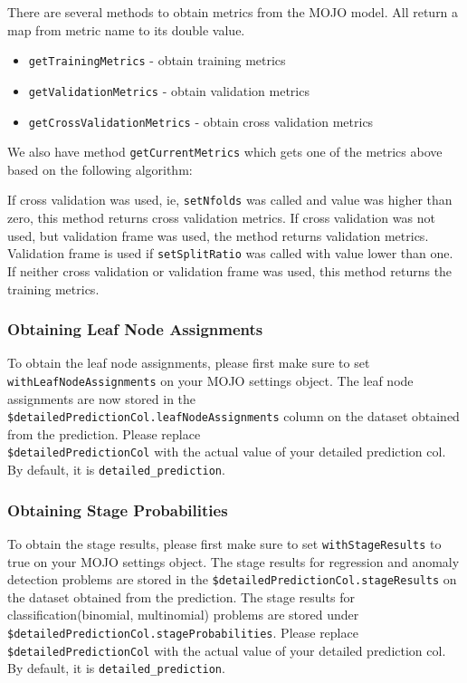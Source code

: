 There are several methods to obtain metrics from the MOJO model. All return a map from metric name to its double value.

\begin{itemize}
    \item \texttt{getTrainingMetrics} - obtain training metrics
    \item \texttt{getValidationMetrics} - obtain validation metrics
    \item \texttt{getCrossValidationMetrics} - obtain cross validation metrics
\end{itemize}


We also have method \texttt{getCurrentMetrics} which gets one of the metrics above based on the following algorithm:

If cross validation was used, ie, \texttt{setNfolds} was called and value was higher than zero, this method returns cross validation
metrics. If cross validation was not used, but validation frame was used, the method returns validation metrics. Validation
frame is used if \texttt{setSplitRatio} was called with value lower than one. If neither cross validation or validation frame
was used, this method returns the training metrics.

\subsubsection{Obtaining Leaf Node Assignments}

To obtain the leaf node assignments, please first make sure to set\\ \texttt{withLeafNodeAssignments}
on your MOJO settings object. The leaf node assignments are now stored
in the \texttt{\${detailedPredictionCol}.leafNodeAssignments} column on the dataset obtained from the prediction.
Please replace\\ \texttt{\${detailedPredictionCol}} with the actual value of your detailed prediction col. By default,
it is \texttt{detailed\_prediction}.

\subsubsection{Obtaining Stage Probabilities}

To obtain the stage results, please first make sure to set \texttt{withStageResults} to true on your MOJO
settings object. The stage results for regression and anomaly detection problems
are stored in the \texttt{\${detailedPredictionCol}.stageResults} on the dataset obtained from the prediction. The
stage results for classification(binomial, multinomial) problems are stored under \\
\texttt{\${detailedPredictionCol}.stageProbabilities}. Please replace \\ \texttt{\${detailedPredictionCol}}
with the actual value of your detailed prediction col. By default, it is \texttt{detailed\_prediction}.

